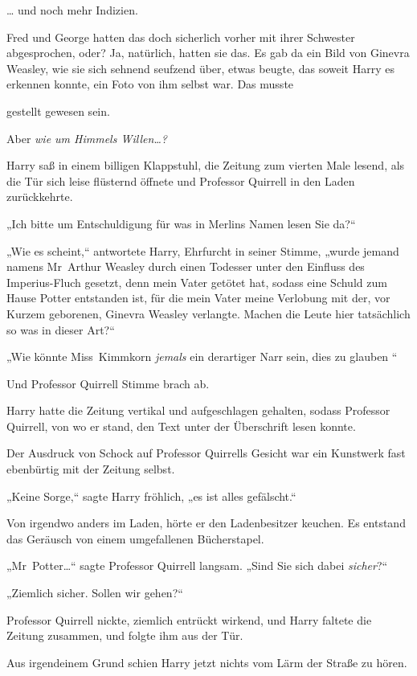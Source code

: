 {… und noch mehr Indizien.

Fred und George hatten das doch sicherlich vorher mit ihrer Schwester abgesprochen, oder? Ja, natürlich, hatten sie das. Es gab da ein Bild von Ginevra Weasley, wie sie sich sehnend seufzend über, etwas beugte, das soweit Harry es erkennen konnte, ein Foto von ihm selbst war. Das musste

gestellt gewesen sein.

Aber \emph{wie um Himmels Willen…?}

Harry saß in einem billigen Klappstuhl, die Zeitung zum vierten Male lesend, als die Tür sich leise flüsternd öffnete und Professor Quirrell in den Laden zurückkehrte.

„Ich bitte um Entschuldigung für \later was in Merlins Namen lesen Sie da?“

„Wie es scheint,“ antwortete Harry, Ehrfurcht in seiner Stimme, „wurde jemand namens Mr~Arthur Weasley durch einen Todesser unter den Einfluss des Imperius-Fluch gesetzt, denn mein Vater getötet hat, sodass eine Schuld zum Hause Potter entstanden ist, für die mein Vater meine Verlobung mit der, vor Kurzem geborenen, Ginevra Weasley verlangte. Machen die Leute hier tatsächlich so was in dieser Art?“

„Wie könnte Miss~Kimmkorn \emph{jemals} ein derartiger Narr sein, dies zu glauben \later“

Und Professor Quirrell Stimme brach ab.

Harry hatte die Zeitung vertikal und aufgeschlagen gehalten, sodass Professor Quirrell, von wo er stand, den Text unter der Überschrift lesen konnte.

Der Ausdruck von Schock auf Professor Quirrells Gesicht war ein Kunstwerk fast ebenbürtig mit der Zeitung selbst.

„Keine Sorge,“ sagte Harry fröhlich, „es ist alles gefälscht.“

Von irgendwo anders im Laden, hörte er den Ladenbesitzer keuchen. Es entstand das Geräusch von einem umgefallenen Bücherstapel.

„Mr~Potter…“ sagte Professor Quirrell langsam. „Sind Sie sich dabei \emph{sicher}?“

„Ziemlich sicher. Sollen wir gehen?“

Professor Quirrell nickte, ziemlich entrückt wirkend, und Harry faltete die Zeitung zusammen, und folgte ihm aus der Tür.

Aus irgendeinem Grund schien Harry jetzt nichts vom Lärm der Straße zu hören.

}

